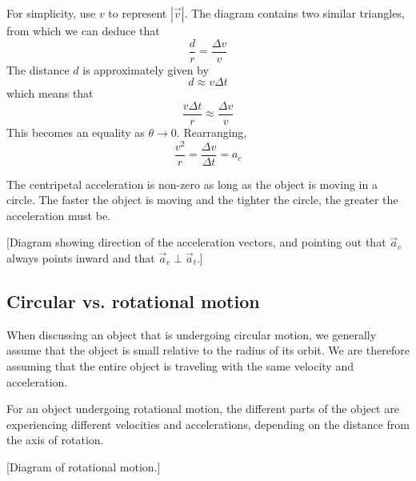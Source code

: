 For simplicity, use $v$ to represent $|\vec{v}|$. The diagram contains two similar triangles, from which we can deduce that
$$\frac{d}{r}=\frac{\Delta v}{v}$$
The distance $d$ is approximately given by
$$d\approx v\Delta t$$
which means that
$$\frac{v\Delta t}{r}\approx\frac{\Delta v}{v}$$
This becomes an equality as $\theta\rightarrow 0$. Rearranging,
$$\frac{v^2}{r}=\frac{\Delta v}{\Delta t}=a_c$$

The centripetal acceleration is non-zero as long as the object is moving in a circle. The faster the object is moving and the tighter the circle, the greater the acceleration must be.

[Diagram showing direction of the acceleration vectors, and pointing out that $\vec{a}_c$ always points inward and that $\vec{a}_c\perp\vec{a}_t$.]
\vspace{3cm}

\subsection{Circular vs. rotational motion}
When discussing an object that is undergoing circular motion, we generally assume that the object is small relative to the radius of its orbit. We are therefore assuming that the entire object is traveling with the same velocity and acceleration.

\vspace{3cm}

For an object undergoing rotational motion, the different parts of the object are experiencing different velocities and accelerations, depending on the distance from the axis of rotation.

[Diagram of rotational motion.]
\vspace{3cm}







